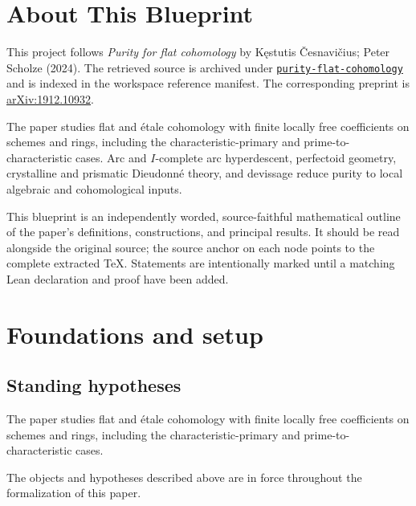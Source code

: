 

\chapter*{About This Blueprint}
\label{purity-flat-cohomology-about}

This project follows \emph{Purity for flat cohomology} by Kęstutis Česnavičius; Peter Scholze (2024). The
retrieved source is archived under
\href{../../../../../references/purity-flat-cohomology/}{\texttt{purity-flat-cohomology}} and is indexed in
the workspace reference manifest. The corresponding preprint is
\href{https://arxiv.org/abs/1912.10932}{arXiv:1912.10932}.

The paper studies flat and étale cohomology with finite locally free coefficients on schemes and rings, including the characteristic-primary and prime-to-characteristic cases. Arc and $I$-complete arc hyperdescent, perfectoid geometry, crystalline and prismatic Dieudonné theory, and devissage reduce purity to local algebraic and cohomological inputs.

This blueprint is an independently worded, source-faithful mathematical
outline of the paper's definitions, constructions, and principal results. It
should be read alongside the original source; the source anchor on each node
points to the complete extracted TeX. Statements are intentionally marked
\notready until a matching Lean declaration and proof have been added.

\chapter{Foundations and setup}
\label{chap:purity-flat-cohomology-foundations}

\section{Standing hypotheses}
\label{sec:purity-flat-cohomology-standing}

The paper studies flat and étale cohomology with finite locally free coefficients on schemes and rings, including the characteristic-primary and prime-to-characteristic cases.

\begin{convention}
\label{purity-flat-cohomology-setup}
The objects and hypotheses described above are in force throughout the
formalization of this paper.
\notready
\end{convention}

